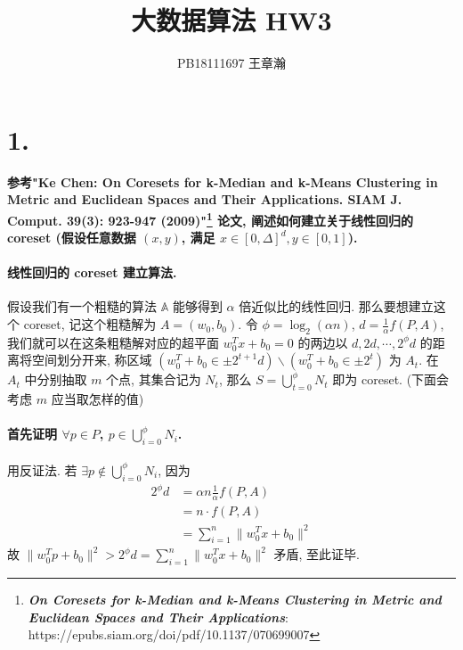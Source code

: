 \documentclass[UTF8]{article}
\title{大数据算法 HW3}
\author{PB18111697 王章瀚}
\newcommand{\jumpLine} {\hspace*{\fill} \par}
\begin{document}
\maketitle
\section*{1.}
\textbf{参考"Ke Chen: On Coresets for k-Median and k-Means Clustering in 
Metric and Euclidean Spaces and Their Applications. SIAM J. Comput. 
39(3): 923-947 (2009)"\footnote{\textbf{\textit{On Coresets for k-Median and k-Means Clustering in Metric and Euclidean Spaces and Their Applications}}: https://epubs.siam.org/doi/pdf/10.1137/070699007} 论文, 阐述如何建立关于线性回归的 coreset
(假设任意数据 $(x, y)$, 满足 $x \in [0, \Delta]^d, y \in [0,1]$).}
\\\jumpLine\noindent
\paragraph{线性回归的 coreset 建立算法.} 假设我们有一个粗糙的算法 $\mathbb{A}$ 能够得到 $\alpha$ 倍近似比的线性回归. 那么要想建立这个 coreset, 记这个粗糙解为 $A=(w_0, b_0)$. 令 $\phi = \log_2(\alpha n)$, $d=\frac{1}{\alpha} f(P, A)$, 我们就可以在这条粗糙解对应的超平面 $w_0^T x+b_0=0$ 的两边以 $d, 2d, \cdots, 2^\phi d$ 的距离将空间划分开来, 称区域 $(w_0^T + b_0 \in \pm 2^{t+1} d) \backslash (w_0^T + b_0 \in \pm 2^{t})$ 为 $A_t$. 在 $A_t$ 中分别抽取 $m$ 个点, 其集合记为 $N_t$, 那么 $S = \bigcup\limits_{t=0}^\phi N_t$ 即为 coreset. (下面会考虑 $m$ 应当取怎样的值)
\\\jumpLine\noindent
\paragraph{首先证明 $\forall p \in P$, $p \in \bigcup\limits_{i=0}^\phi N_i$.} 用反证法.
若 $\exists p \notin \bigcup\limits_{i=0}^\phi N_i$, 因为
$$\begin{aligned}
	2^\phi d &= \alpha n \frac{1}{\alpha} f(P, A) \\
	&= n\cdot f(P, A) \\
	&=\sum\limits_{i=1}^n \|w_0^Tx + b_0\|^2
\end{aligned}$$
故 $\|w_0^Tp + b_0\|^2 > 2^\phi d = \sum\limits_{i=1}^n \|w_0^Tx + b_0\|^2$ 矛盾, 至此证毕.
\\\jumpLine\noindent
\end{document}
